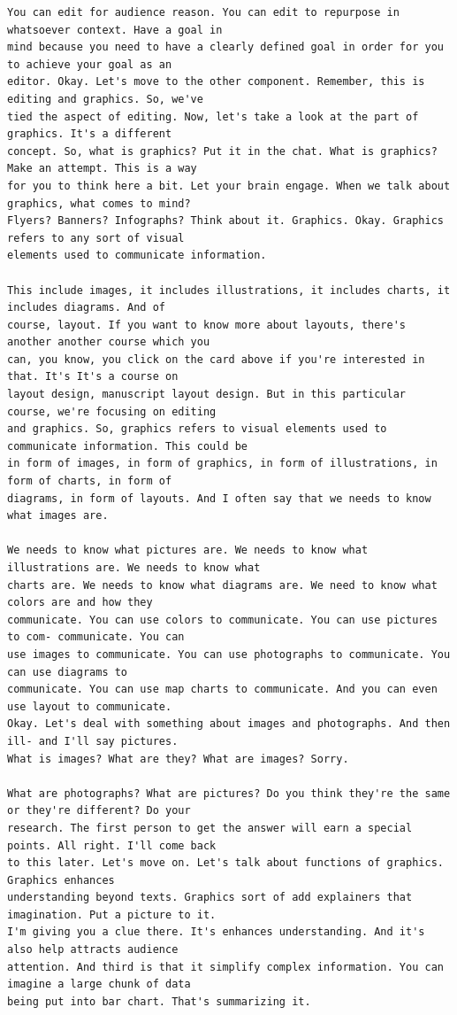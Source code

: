 {\begin{Verbatim}
You can edit for audience reason. You can edit to repurpose in whatsoever context. Have a goal in
mind because you need to have a clearly defined goal in order for you to achieve your goal as an
editor. Okay. Let's move to the other component. Remember, this is editing and graphics. So, we've
tied the aspect of editing. Now, let's take a look at the part of graphics. It's a different
concept. So, what is graphics? Put it in the chat. What is graphics? Make an attempt. This is a way
for you to think here a bit. Let your brain engage. When we talk about graphics, what comes to mind?
Flyers? Banners? Infographs? Think about it. Graphics. Okay. Graphics refers to any sort of visual
elements used to communicate information.

This include images, it includes illustrations, it includes charts, it includes diagrams. And of
course, layout. If you want to know more about layouts, there's another another course which you
can, you know, you click on the card above if you're interested in that. It's It's a course on
layout design, manuscript layout design. But in this particular course, we're focusing on editing
and graphics. So, graphics refers to visual elements used to communicate information. This could be
in form of images, in form of graphics, in form of illustrations, in form of charts, in form of
diagrams, in form of layouts. And I often say that we needs to know what images are.

We needs to know what pictures are. We needs to know what illustrations are. We needs to know what
charts are. We needs to know what diagrams are. We need to know what colors are and how they
communicate. You can use colors to communicate. You can use pictures to com- communicate. You can
use images to communicate. You can use photographs to communicate. You can use diagrams to
communicate. You can use map charts to communicate. And you can even use layout to communicate.
Okay. Let's deal with something about images and photographs. And then ill- and I'll say pictures.
What is images? What are they? What are images? Sorry.

What are photographs? What are pictures? Do you think they're the same or they're different? Do your
research. The first person to get the answer will earn a special points. All right. I'll come back
to this later. Let's move on. Let's talk about functions of graphics. Graphics enhances
understanding beyond texts. Graphics sort of add explainers that imagination. Put a picture to it.
I'm giving you a clue there. It's enhances understanding. And it's also help attracts audience
attention. And third is that it simplify complex information. You can imagine a large chunk of data
being put into bar chart. That's summarizing it.


\end{Verbatim}}
